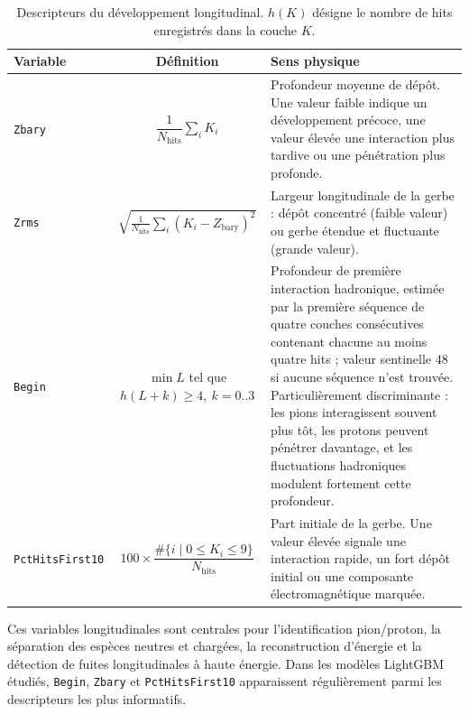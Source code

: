 \begin{table}[!ht]
    \centering
    \caption{Descripteurs du développement longitudinal. \(h(K)\) désigne le nombre de hits
             enregistrés dans la couche \(K\).}
    \label{tab:annexeA-long}
    \small
    \begin{tabularx}{\textwidth}{@{}l c X@{}}
        \toprule
        \textbf{Variable} & \textbf{Définition} & \textbf{Sens physique} \\
        \midrule
        \texttt{Zbary}
            & \(\dfrac{1}{N_{\mathrm{hits}}}\displaystyle\sum_{i} K_i\)
            & Profondeur moyenne de dépôt. Une valeur faible indique un développement précoce,
              une valeur élevée une interaction plus tardive ou une pénétration plus
              profonde. \\[4pt]
        \texttt{Zrms}
            & \(\sqrt{\tfrac{1}{N_{\mathrm{hits}}}\sum_i (K_i - Z_{\mathrm{bary}})^2}\)
            & Largeur longitudinale de la gerbe : dépôt concentré (faible valeur) ou gerbe
              étendue et fluctuante (grande valeur). \\[4pt]
        \texttt{Begin}
            & \(\min L\) tel que \(h(L{+}k)\ge 4,\ k=0..3\)
            & Profondeur de première interaction hadronique, estimée par la première séquence de
              quatre couches consécutives contenant chacune au moins quatre hits ; valeur
              sentinelle \(48\) si aucune séquence n'est trouvée. Particulièrement
              discriminante : les pions interagissent souvent plus tôt, les protons peuvent
              pénétrer davantage, et les fluctuations hadroniques modulent fortement cette
              profondeur. \\[4pt]
        \texttt{PctHitsFirst10}
            & \(100 \times \dfrac{\#\{i \mid 0 \le K_i \le 9\}}{N_{\mathrm{hits}}}\)
            & Part initiale de la gerbe. Une valeur élevée signale une interaction rapide, un
              fort dépôt initial ou une composante électromagnétique marquée. \\
        \bottomrule
    \end{tabularx}
\end{table}

Ces variables longitudinales sont centrales pour l'identification pion/proton, la séparation des
espèces neutres et chargées, la reconstruction d'énergie et la détection de fuites longitudinales à
haute énergie. Dans les modèles LightGBM étudiés, \texttt{Begin}, \texttt{Zbary} et
\texttt{PctHitsFirst10} apparaissent régulièrement parmi les descripteurs les plus informatifs.

